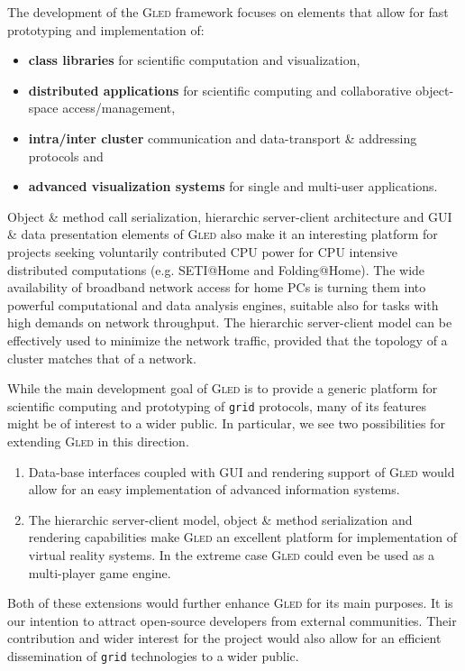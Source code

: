 \documentclass[final]{siamltex}
\def\gled{\textsc{Gled}\xspace}
\def\grid{\texttt{grid}\xspace}
\begin{document}
The development of the \gled framework focuses on elements that allow
for fast prototyping and implementation of:

\begin{itemize}
\item \textbf{class libraries} for scientific computation and visualization,
\item \textbf{distributed applications} for scientific computing and
  collaborative object-space access/management,
\item \textbf{intra/inter cluster} communication and
  data-transport \& addressing protocols and
\item \textbf{advanced visualization systems} for single and
  multi-user applications.
\end{itemize}

Object \& method call serialization, hierarchic server-client
architecture and GUI \& data presentation elements of \gled also make
it an interesting platform for projects seeking voluntarily contributed
CPU power for CPU intensive distributed computations (e.g.
SETI@Home\cite{seti} and Folding@Home\cite{folding}). The wide
availability of broadband network access for home PCs is turning them
into powerful computational and data analysis engines, suitable also
for tasks with high demands on network throughput. The hierarchic
server-client model can be effectively used to minimize the network
traffic, provided that the topology of a cluster matches that of a
network.

While the main development goal of \gled is to provide a generic
platform for scientific computing and prototyping of \grid protocols,
many of its features might be of interest to a wider public. In
particular, we see two possibilities for extending \gled in this
direction.
\begin{enumerate}
\item Data-base interfaces coupled with GUI and rendering support of \gled
  would allow for an easy implementation of advanced information
  systems.
\item The hierarchic server-client model, object \& method
  serialization and rendering capabilities make \gled an excellent
  platform for implementation of virtual reality systems. In the
  extreme case \gled could even be used as a multi-player game engine.
\end{enumerate}
Both of these extensions would further enhance \gled for its
main purposes. It is our intention to attract open-source developers
from external communities. Their contribution and wider interest for
the project would also allow for an efficient dissemination of \grid
technologies to a wider public.
\end{document}

